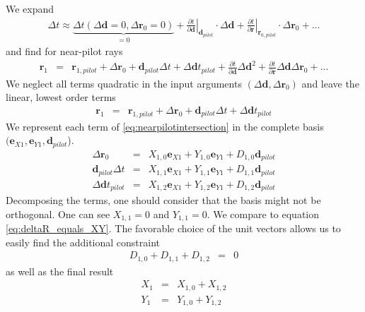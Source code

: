 \documentclass[12pt,a4paper,twoside,openright,BCOR10mm,headsepline,titlepage,abstracton,chapterprefix,final]{scrreprt}
\newcommand\Vector[1]{{\mathbf{#1}}}
\begin{document}
We expand
\begin{eqnarray}
 \Delta t \approx 
    \underbrace{
      \Delta t(\Delta\Vector{d} = 0, \Delta\Vector{r}_0 = 0)
    }_{=0}
    + \left. \frac{\partial t}{\partial\Vector{d}} \right|_{\Vector{d}_{pilot}}  \cdot \Delta\Vector{d} 
    + \left. \frac{\partial t}{\partial\Vector{r}} \right|_{\Vector{r}_{0,pilot}} \cdot \Delta\Vector{r}_0 
    + ...
    \label{eq:delta_t}
\end{eqnarray}
and find for near-pilot rays
\begin{eqnarray}
 \Vector{r}_1 &=& \Vector{r}_{1,pilot} + \Delta\Vector{r}_0 + \Vector{d}_{pilot}\Delta t + \Delta\Vector{d}t_{pilot} 
      + \frac{\partial t}{\partial\Vector{d}} \Delta\Vector{d}^2 
      + \frac{\partial t}{\partial\Vector{r}} \Delta\Vector{d} \Delta\Vector{r}_0 + ...
\end{eqnarray} 
We neglect all terms quadratic in the input arguments $(\Delta\Vector{d}, \Delta\Vector{r}_0)$
and leave the linear, lowest order terms
\begin{eqnarray}
 \Vector{r}_1 &=& \Vector{r}_{1,pilot} + \Delta\Vector{r}_0 + \Vector{d}_{pilot}\Delta t + \Delta\Vector{d}t_{pilot}
 \label{eq:nearpilotintersection}
\end{eqnarray} 
We represent each term of \ref{eq:nearpilotintersection} in the complete basis $(\Vector{e}_{X1}, \Vector{e}_{Y1}, \Vector{d}_{pilot}$).
\begin{eqnarray}
 \Delta\Vector{r}_0 &=& X_{1,0} \Vector{e}_{X1} + Y_{1,0} \Vector{e}_{Y1} + D_{1,0} \Vector{d}_{pilot} \\
 \Vector{d}_{pilot}\Delta t &=& X_{1,1} \Vector{e}_{X1} + Y_{1,1} \Vector{e}_{Y1} + D_{1,1} \Vector{d}_{pilot} \\
 \Delta\Vector{d}t_{pilot} &=& X_{1,2} \Vector{e}_{X1} + Y_{1,2} \Vector{e}_{Y1} + D_{1,2} \Vector{d}_{pilot} 
\end{eqnarray}
Decomposing the terms, one should consider that the basis might not be orthogonal.
One can see $X_{1,1} = 0$ and $Y_{1,1}=0$.
We compare to equation \ref{eq:deltaR_equals_XY}. 
The favorable choice of the unit vectors allows us to easily find the additional constraint
\begin{eqnarray}
 D_{1,0} + D_{1,1} + D_{1,2} &=& 0
\end{eqnarray}
as well as the final result
\begin{eqnarray}
 X_1 &=& X_{1,0} + X_{1,2} \\
 Y_1 &=& Y_{1,0} + Y_{1,2}
\end{eqnarray}
\end{document}

